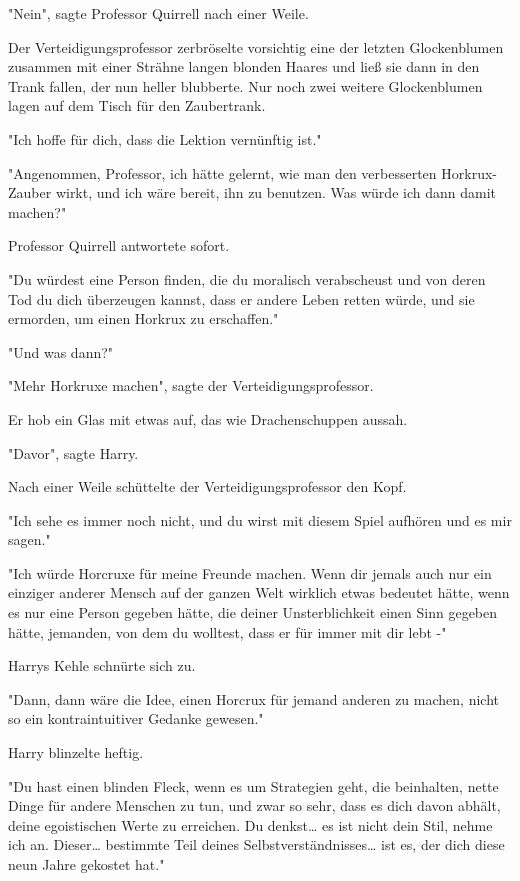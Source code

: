 {"Nein", sagte Professor Quirrell nach einer Weile.

Der Verteidigungsprofessor zerbröselte vorsichtig eine der letzten Glockenblumen zusammen mit einer Strähne langen blonden Haares und ließ sie dann in den Trank fallen, der nun heller blubberte. Nur noch zwei weitere Glockenblumen lagen auf dem Tisch für den Zaubertrank.

"Ich hoffe für dich, dass die Lektion vernünftig ist."

"Angenommen, Professor, ich hätte gelernt, wie man den verbesserten Horkrux-Zauber wirkt, und ich wäre bereit, ihn zu benutzen. Was würde ich dann damit machen?"

Professor Quirrell antwortete sofort.

"Du würdest eine Person finden, die du moralisch verabscheust und von deren Tod du dich überzeugen kannst, dass er andere Leben retten würde, und sie ermorden, um einen Horkrux zu erschaffen."

"Und was dann?"

"Mehr Horkruxe machen", sagte der Verteidigungsprofessor.

Er hob ein Glas mit etwas auf, das wie Drachenschuppen aussah.

"Davor", sagte Harry.

Nach einer Weile schüttelte der Verteidigungsprofessor den Kopf.

"Ich sehe es immer noch nicht, und du wirst mit diesem Spiel aufhören und es mir sagen."

"Ich würde Horcruxe für meine Freunde machen. Wenn dir jemals auch nur ein einziger anderer Mensch auf der ganzen Welt wirklich etwas bedeutet hätte, wenn es nur eine Person gegeben hätte, die deiner Unsterblichkeit einen Sinn gegeben hätte, jemanden, von dem du wolltest, dass er für immer mit dir lebt -"

Harrys Kehle schnürte sich zu.

"Dann, dann wäre die Idee, einen Horcrux für jemand anderen zu machen, nicht so ein kontraintuitiver Gedanke gewesen."

Harry blinzelte heftig.

"Du hast einen blinden Fleck, wenn es um Strategien geht, die beinhalten, nette Dinge für andere Menschen zu tun, und zwar so sehr, dass es dich davon abhält, deine egoistischen Werte zu erreichen. Du denkst… es ist nicht dein Stil, nehme ich an. Dieser… bestimmte Teil deines Selbstverständnisses… ist es, der dich diese neun Jahre gekostet hat."

}

